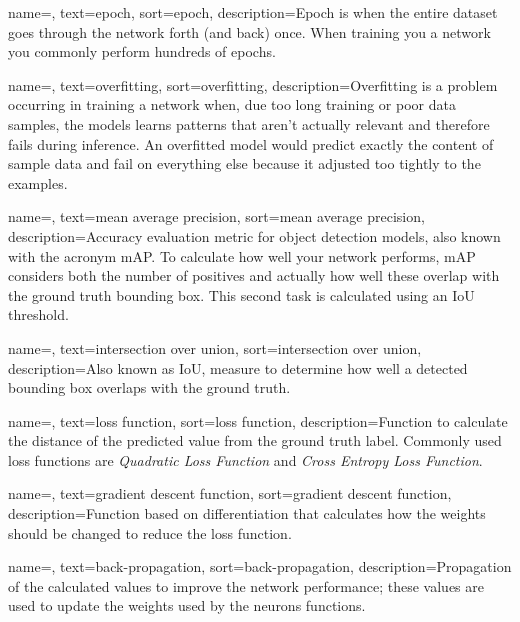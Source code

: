 {
	name=,
	text=epoch,
	sort=epoch,
	description={Epoch is when the entire dataset goes through the network forth (and back) once. When training you a network you commonly perform hundreds of epochs.}
}

{
	name=,
	text=overfitting,
	sort=overfitting,
	description={Overfitting is a problem occurring in training a network when, due too long training or poor data samples, the models learns patterns that aren't actually relevant and therefore fails during inference. An overfitted model would predict exactly the content of sample data and fail on everything else because it adjusted too tightly to the examples.}
}

{
	name=,
	text=mean average precision,
	sort=mean average precision,
	description={Accuracy evaluation metric for object detection models, also known with the acronym mAP. To calculate how well your network performs, mAP considers both the number of positives and actually how well these overlap with the ground truth bounding box. This second task is calculated using an IoU threshold.}
}

{
	name=,
	text=intersection over union,
	sort=intersection over union,
	description={Also known as IoU, measure to determine how well a detected bounding box overlaps with the ground truth.}
}

{
	name=,
	text=loss function,
	sort=loss function,
	description={Function to calculate the distance of the predicted value from the ground truth label. Commonly used loss functions are \emph{Quadratic Loss Function} and \emph{Cross Entropy Loss Function}.}
}

{
	name=,
	text=gradient descent function,
	sort=gradient descent function,
	description={Function based on differentiation that calculates how the weights should be changed to reduce the loss function.}
}

{
	name=,
	text=back-propagation,
	sort=back-propagation,
	description={Propagation of the calculated values to improve the network performance; these values are used to update the weights used by the neurons functions.}
}


